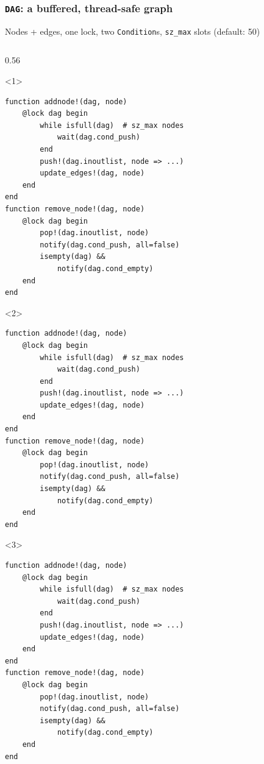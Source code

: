 \documentclass{beamer}
\begin{document}
\begin{frame}[fragile]
	\frametitle{\texttt{DAG}: a buffered, thread-safe graph}
	Nodes + edges, one \alert{lock}, two \texttt{Condition}s, \texttt{sz\_max} slots (default: 50)

	\medskip
	\begin{columns}[T]
		\begin{column}{0.56\textwidth}
			\begin{onlyenv}<1>
				\begin{verbatim}
function addnode!(dag, node)
    @lock dag begin
        while isfull(dag)  # sz_max nodes
            wait(dag.cond_push)
        end
        push!(dag.inoutlist, node => ...)
        update_edges!(dag, node)
    end
end
function remove_node!(dag, node)
    @lock dag begin
        pop!(dag.inoutlist, node)
        notify(dag.cond_push, all=false)
        isempty(dag) &&
            notify(dag.cond_empty)
    end
end
				\end{verbatim}
			\end{onlyenv}
			\begin{onlyenv}<2>
				\begin{verbatim}
function addnode!(dag, node)
    @lock dag begin
        while isfull(dag)  # sz_max nodes
            wait(dag.cond_push)
        end
        push!(dag.inoutlist, node => ...)
        update_edges!(dag, node)
    end
end
function remove_node!(dag, node)
    @lock dag begin
        pop!(dag.inoutlist, node)
        notify(dag.cond_push, all=false)
        isempty(dag) &&
            notify(dag.cond_empty)
    end
end
				\end{verbatim}
			\end{onlyenv}
			\begin{onlyenv}<3>
				\begin{verbatim}
function addnode!(dag, node)
    @lock dag begin
        while isfull(dag)  # sz_max nodes
            wait(dag.cond_push)
        end
        push!(dag.inoutlist, node => ...)
        update_edges!(dag, node)
    end
end
function remove_node!(dag, node)
    @lock dag begin
        pop!(dag.inoutlist, node)
        notify(dag.cond_push, all=false)
        isempty(dag) &&
            notify(dag.cond_empty)
    end
end
				\end{verbatim}

\end{onlyenv}
\end{column}
\end{columns}
\end{frame}
\end{document}
